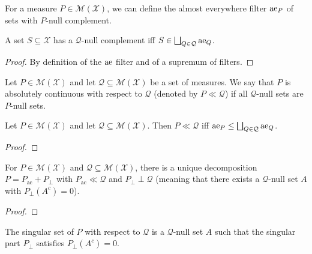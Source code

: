 For a measure $P \in \mathcal{M}(\mathcal{X})$, we can define the almost everywhere filter $\operatorname{ae}_P$ of sets with $P$-null complement.

\begin{lemma}\label{lem:aeSet_filter}
  \leanok
A set $S \subseteq \mathcal{X}$ has a $\mathcal{Q}$-null complement iff $S \in \bigsqcup_{Q \in \mathcal{Q}} \operatorname{ae}_Q$.
\end{lemma}

\begin{proof}\leanok
By definition of the $\operatorname{ae}$ filter and of a supremum of filters.
\end{proof}


\begin{definition}\label{def:acSet}
  Let $P \in \mathcal{M}(\mathcal{X})$ and let $\mathcal{Q} \subseteq \mathcal{M}(\mathcal{X})$ be a set of measures.
  We say that $P$ is absolutely continuous with respect to $\mathcal{Q}$ (denoted by $P \ll \mathcal{Q}$) if all $\mathcal{Q}$-null sets are $P$-null sets.
\end{definition}


\begin{lemma}\label{lem:acSet_iff}
Let $P \in \mathcal{M}(\mathcal{X})$ and let $\mathcal{Q} \subseteq \mathcal{M}(\mathcal{X})$.
Then $P \ll \mathcal{Q}$ iff $\operatorname{ae}_P \le \bigsqcup_{Q \in \mathcal{Q}} \operatorname{ae}_Q$.
\end{lemma}

\begin{proof}

\end{proof}


\begin{lemma}\label{lem:RN_acSet}
For $P \in \mathcal{M}(\mathcal{X})$ and $\mathcal{Q} \subseteq \mathcal{M}(\mathcal{X})$, there is a unique decomposition $P = P_{\mathrm{ac}} + P_{\perp}$ with $P_{\mathrm{ac}} \ll \mathcal{Q}$ and $P_{\perp} \perp \mathcal{Q}$ (meaning that there exists a $\mathcal{Q}$-null set $A$ with $P_{\perp}(A^c) = 0$).
\end{lemma}

\begin{proof}

\end{proof}


\begin{definition}\label{def:singularSet}
The singular set of $P$ with respect to $\mathcal{Q}$ is a $\mathcal{Q}$-null set $A$ such that the singular part $P_{\perp}$ satisfies $P_{\perp}(A^c) = 0$.
\end{definition}


